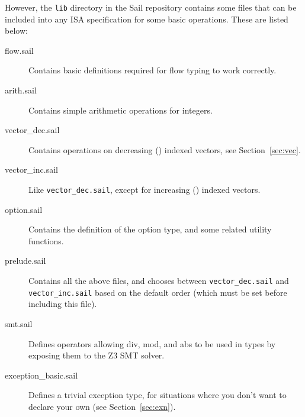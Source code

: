 However, the \verb+lib+ directory in the Sail repository contains some
files that can be included into any ISA specification for some basic
operations. These are listed below:
\begin{description}
  \item[flow.sail] Contains basic definitions required for flow
    typing to work correctly.
  \item[arith.sail] Contains simple arithmetic operations for
    integers.
  \item[vector\_dec.sail] Contains operations on decreasing
    () indexed vectors, see Section~\ref{sec:vec}.
  \item[vector\_inc.sail] Like \verb+vector_dec.sail+, except
    for increasing () indexed vectors.
  \item[option.sail] Contains the definition of the option
    type, and some related utility functions.
  \item[prelude.sail] Contains all the above files, and chooses
    between \verb+vector_dec.sail+ and \verb+vector_inc.sail+ based on
    the default order (which must be set before including this file).
  \item[smt.sail] Defines operators allowing div, mod, and abs
    to be used in types by exposing them to the Z3 SMT solver.
  \item[exception\_basic.sail] Defines a trivial exception type, for
    situations where you don't want to declare your own (see
    Section~\ref{sec:exn}).
\end{description}
